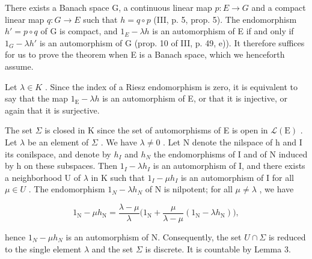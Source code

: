 There exists a Banach space G, a continuous linear map \(p: E \rightarrow G\) and a compact linear map \(q: G \rightarrow E\) such that \(h = q \circ p\) (III, p. 5, prop. 5). The endomorphism \(h' = p \circ q\) of G is compact, and \(1_{E} - \lambda h\) is an automorphism of E if and only if \(1_{G} - \lambda h'\) is an automorphism of G (prop. 10 of III, p. 49, e)). It therefore suffices for us to prove the theorem when E is a Banach space, which we henceforth assume.

Let \(\lambda \in K\) . Since the index of a Riesz endomorphism is zero, it is equivalent to say that the map \(1_{\mathrm{E}} - \lambda h\) is an automorphism of E, or that it is injective, or again that it is surjective.

The set \(\Sigma\) is closed in K since the set of automorphisms of E is open in \(\mathcal{L}(\mathrm{E})\) . Let \(\lambda\) be an element of \(\Sigma\) . We have \(\lambda \neq 0\) . Let N denote the nilspace of h and I its conilspace, and denote by \(h_{I}\) and \(h_{N}\) the endomorphisms of I and of N induced by h on these subspaces. Then \(1_{I} - \lambda h_{I}\) is an automorphism of I, and there exists a neighborhood U of \(\lambda\) in K such that \(1_{I} - \mu h_{I}\) is an automorphism of I for all \(\mu \in U\) . The endomorphism \(1_{N} - \lambda h_{N}\) of N is nilpotent; for all \(\mu \neq \lambda\) , we have

\[
1 _ {\mathrm{N}} - \mu h _ {\mathrm{N}} = \frac {\lambda - \mu}{\lambda} \Big (1 _ {\mathrm{N}} + \frac {\mu}{\lambda - \mu} (1 _ {\mathrm{N}} - \lambda h _ {\mathrm{N}}) \Big),
\]

hence \(1_{N} - \mu h_{N}\) is an automorphism of N. Consequently, the set \(U \cap \Sigma\) is reduced to the single element \(\lambda\) and the set \(\Sigma\) is discrete. It is countable by Lemma 3.

